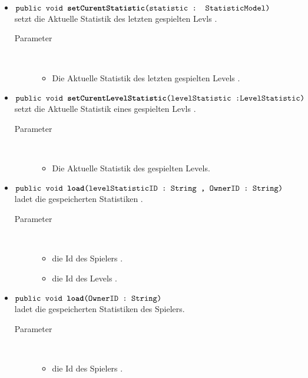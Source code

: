 \begin{description}
\begin{itemize}
		\item $\texttt{public void \textbf{setCurentStatistic}(statistic : StatisticModel)}$ \\ setzt die Aktuelle Statistik des  letzten gespielten Levls .
				\begin{description}
					\item[Parameter] \hfill \\
					\vspace{-.8cm}
					\begin{itemize}
						\item Die Aktuelle Statistik  des letzten gespielten Levels .
					\end{itemize}
				\end{description}
		\item $\texttt{public void \textbf{setCurentLevelStatistic}(levelStatistic :LevelStatistic)}$ \\ setzt die Aktuelle Statistik eines gespielten Levls .
				\begin{description}
					\item[Parameter] \hfill \\
					\vspace{-.8cm}
					\begin{itemize}
						\item Die Aktuelle Statistik  des  gespielten Levels.
					\end{itemize}
				\end{description}
				\item $\texttt{public void \textbf{load}(levelStatisticID : String , OwnerID : String)}$ \\ ladet die gespeicherten Statistiken .
				\begin{description}
					\item[Parameter] \hfill \\
					\vspace{-.8cm}
					\begin{itemize}
						\item die Id des Spielers .
						\item die Id des Levels .
					\end{itemize}
				\end{description}
				\item $\texttt{public void \textbf{load}(OwnerID : String)}$ \\ ladet die gespeicherten Statistiken des Spielers.
				\begin{description}
					\item[Parameter] \hfill \\
					\vspace{-.8cm}
					\begin{itemize}
						\item die Id des Spielers .
					\end{itemize}
				\end{description}
				

\end{itemize}
\end{description}
